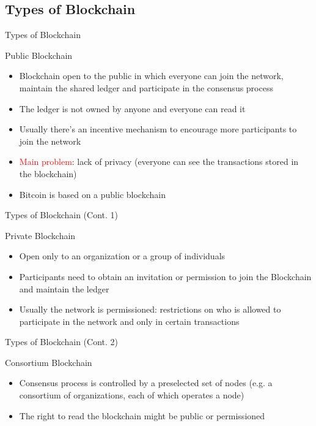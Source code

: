 \documentclass{beamer}
\newcommand\red[1]{\textcolor{red}{#1}}
\begin{document}
  \subsection{Types of Blockchain}
  \begin{frame}{Types of Blockchain}
    \begin{block}{Public Blockchain}
      \begin{itemize}
        \item Blockchain open to the public in which everyone can join the network,
        maintain the shared ledger and participate in the consensus process \pause
        \item The ledger is not owned by anyone and everyone can read it \pause
        \item Usually there's an incentive mechanism to encourage more participants
        to join the network \pause
        \item \red{Main problem}: lack of privacy (everyone can see the transactions
        stored in the blockchain) \pause
        \item Bitcoin is based on a public blockchain
      \end{itemize}
    \end{block}
  \end{frame}




  \begin{frame}{Types of Blockchain (Cont. 1)}
    \begin{block}{Private Blockchain}
      \begin{itemize}
        \item Open only to an organization or a group of individuals \pause
        \item Participants need to obtain an invitation or permission to
        join the Blockchain and maintain the ledger \pause
        \item Usually the network is permissioned: restrictions on who is
        allowed to participate in the network and only in certain transactions
      \end{itemize}
    \end{block}
  \end{frame}




  \begin{frame}{Types of Blockchain (Cont. 2)}
    \begin{block}{Consortium Blockchain}
      \begin{itemize}
        \item Consensus process is controlled by a preselected set of nodes
        (e.g. a consortium of organizations, each of which operates a node) \pause
        \item  The right to read the blockchain might be public or permissioned
      \end{itemize}
    \end{block}
  \end{frame}
\end{document}
